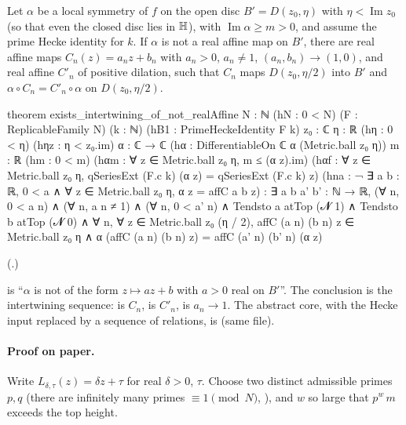 \begin{theorem}\label{ch19:thm:overlap}
Let $\alpha$ be a local symmetry of $f$ on the open disc $B'=D(z_0,\eta)$ with $\eta<\operatorname{Im}z_0$ (so that even the closed disc lies in $\mathbb{H}$), with $\operatorname{Im}\alpha\ge m>0$, and assume the
prime Hecke identity for $k$.  If $\alpha$ is not a real affine map on $B'$, there are real affine maps $C_n(z)=a_nz+b_n$ with $a_n>0$,
$a_n\ne1$, $(a_n,b_n)\to(1,0)$, and real affine $C'_n$ of positive dilation, such that $C_n$ maps $D(z_0,\eta/2)$ into $B'$ and
$\alpha\circ C_n=C'_n\circ\alpha$ on $D(z_0,\eta/2)$.
\end{theorem}
\begin{leancode}
theorem exists_intertwining_of_not_realAffine {N : ℕ} (hN : 0 < N) (F : ReplicableFamily N)
    (k : ℕ) (hB1 : PrimeHeckeIdentity F k) {z₀ : ℂ} {η : ℝ} (hη : 0 < η) (hηz : η < z₀.im)
    {α : ℂ → ℂ} (hα : DifferentiableOn ℂ α (Metric.ball z₀ η)) {m : ℝ} (hm : 0 < m)
    (hαm : ∀ z ∈ Metric.ball z₀ η, m ≤ (α z).im)
    (hαf : ∀ z ∈ Metric.ball z₀ η, qSeriesExt (F.c k) (α z) = qSeriesExt (F.c k) z)
    (hna : ¬ ∃ a b : ℝ, 0 < a ∧ ∀ z ∈ Metric.ball z₀ η, α z = affC a b z) :
    ∃ a b a' b' : ℕ → ℝ, (∀ n, 0 < a n) ∧ (∀ n, a n ≠ 1) ∧ (∀ n, 0 < a' n) ∧
      Tendsto a atTop (𝓝 1) ∧ Tendsto b atTop (𝓝 0) ∧
      ∀ n, ∀ z ∈ Metric.ball z₀ (η / 2), affC (a n) (b n) z ∈ Metric.ball z₀ η ∧
        α (affC (a n) (b n) z) = affC (a' n) (b' n) (α z)
\end{leancode}
(.)
\begin{dictionary}
 is ``$\alpha$ is not of the form $z\mapsto az+b$ with $a>0$ real on $B'$''.  The conclusion is the intertwining sequence:
 is $C_n$,  is $C'_n$,  is $a_n\to1$.  The abstract core,
with the Hecke input replaced by a sequence of relations, is  (same file).
\end{dictionary}
\paragraph{Proof on paper.}  Write $L_{\delta,\tau}(z)=\delta z+\tau$ for real $\delta>0$, $\tau$.  Choose two distinct admissible primes
$p,q$ (there are infinitely many primes $\equiv1\pmod N$, ), and $w$ so large that $p^w\,m$
exceeds the top height.

